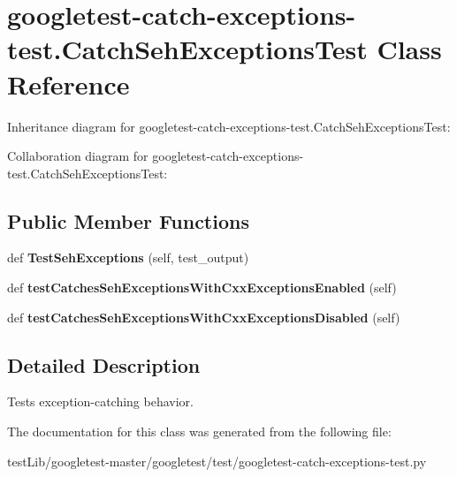 \hypertarget{classgoogletest-catch-exceptions-test_1_1CatchSehExceptionsTest}{}\section{googletest-\/catch-\/exceptions-\/test.Catch\+Seh\+Exceptions\+Test Class Reference}
\label{classgoogletest-catch-exceptions-test_1_1CatchSehExceptionsTest}


Inheritance diagram for googletest-\/catch-\/exceptions-\/test.Catch\+Seh\+Exceptions\+Test\+:


Collaboration diagram for googletest-\/catch-\/exceptions-\/test.Catch\+Seh\+Exceptions\+Test\+:
\subsection*{Public Member Functions}
\begin{DoxyCompactItemize}
\item 
\mbox{\label{classgoogletest-catch-exceptions-test_1_1CatchSehExceptionsTest_a86d5639a464b9ee5e05816758bd1ae1f}} 
def {\bfseries Test\+Seh\+Exceptions} (self, test\+\_\+output)
\item 
\mbox{\label{classgoogletest-catch-exceptions-test_1_1CatchSehExceptionsTest_abfb6b8448b7af79621f6f663e40ebca3}} 
def {\bfseries test\+Catches\+Seh\+Exceptions\+With\+Cxx\+Exceptions\+Enabled} (self)
\item 
\mbox{\label{classgoogletest-catch-exceptions-test_1_1CatchSehExceptionsTest_a8e448244058ea16b0ba3148678c0b9e6}} 
def {\bfseries test\+Catches\+Seh\+Exceptions\+With\+Cxx\+Exceptions\+Disabled} (self)
\end{DoxyCompactItemize}


\subsection{Detailed Description}
\begin{DoxyVerb}Tests exception-catching behavior.\end{DoxyVerb}
 

The documentation for this class was generated from the following file\+:\begin{DoxyCompactItemize}
\item 
test\+Lib/googletest-\/master/googletest/test/googletest-\/catch-\/exceptions-\/test.\+py\end{DoxyCompactItemize}
